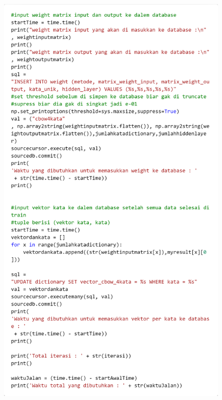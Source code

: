 \documentclass[12pt]{report}
\begin{document}
\begin{figure}[H]
\centering
\includegraphics[scale=0.3]{trainingcbow4kata5}
\end{figure}
\end{document}
